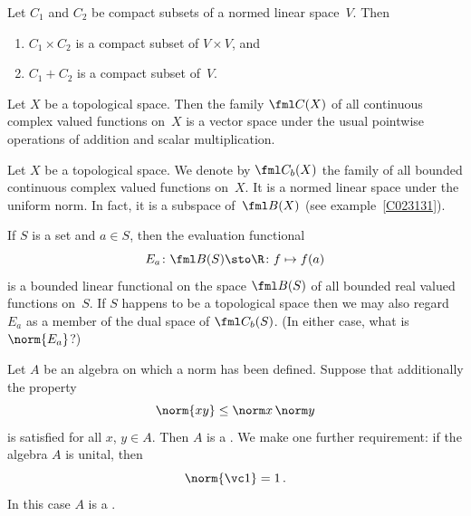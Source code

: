 \begin{prop} Let $C_1$ and $C_2$ be compact subsets of a normed linear space~$V$. Then
   \begin{enumerate}
     \item $C_1 \times C_2$ is a compact subset of $V \times V$, and
     \item $C_1 + C_2$ is a compact subset of~$V$.
   \end{enumerate}
\end{prop}

\begin{exam}\label{C023441}  Let $X$ be a topological space.  Then the family
$\fml C(X)$ of all continuous complex valued functions on~$X$ is a
vector space under the usual pointwise operations of addition and scalar multiplication.
\end{exam}

\begin{exam}\label{C023443}  Let $X$ be a topological space.  We denote
by $\fml C_b(X)$ the family of all bounded continuous complex valued functions on~$X$.  It is a
normed linear space under the uniform norm.  In fact, it is a subspace of~$\fml B(X)$
(see example~\ref{C023131}).
\end{exam}

\begin{exam}\label{C023464} If $S$ is a set and $a \in S$, then the evaluation functional
     \[ E_a\colon \fml B(S) \sto \R\colon f \mapsto f(a) \]
is a bounded linear functional on the space $\fml B(S)$ of all bounded real valued
functions on~$S$. If $S$ happens to be a topological space then we may also regard $E_a$
as a member of the dual space of $\fml C_b(S)$.  (In either case, what is~$\norm{E_a}$?)
\end{exam}

\begin{defn}\label{def_norm_alg} Let $A$ be an algebra on which a norm has been defined.  Suppose that additionally the
 property
  \[ \norm{xy} \le \norm x\,\norm y \]
is satisfied for all $x$, $y \in A$.  Then $A$ is a
.  We make one further requirement: if the algebra $A$ is unital, then
   \[ \norm{\vc 1} = 1\,. \]
In this case $A$ is a
.
\end{defn}

